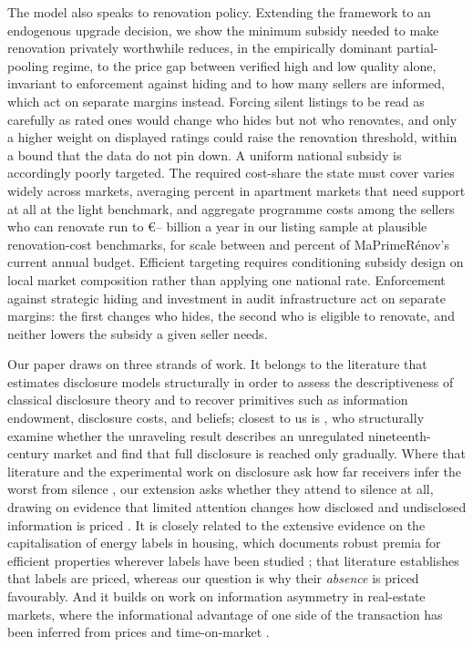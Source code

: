 The model also speaks to renovation policy. Extending the framework to an endogenous upgrade
decision, we show the minimum subsidy needed to make renovation privately worthwhile reduces, in
the empirically dominant partial-pooling regime, to the price gap between verified high and low
quality alone, invariant to enforcement against hiding and to how many sellers are informed,
which act on separate margins instead. Forcing silent listings to be read as carefully as rated ones would change who hides but not who renovates, and only a higher weight on displayed ratings could raise the renovation threshold, within a bound that the data do not pin down. %
A uniform national subsidy is accordingly poorly targeted. The
required cost-share the state must cover varies widely across
markets, averaging \attBaseCostShareTwoFiftyApt{} percent in apartment markets that need support at all at the light benchmark, and aggregate programme costs among the sellers who can renovate run to
\euro{}\attScCostBaseTotTwoFifty{}--\attScCostBaseTotFiveHundred{} billion a year in our listing sample at plausible renovation-cost benchmarks, for scale between \attScCostBaseTotTwoFiftyLo{} and
\attScCostBaseTotFiveHundredHi{} percent of MaPrimeR\'enov's current annual budget. Efficient targeting requires conditioning subsidy design
on local market composition rather than applying one national rate. Enforcement against strategic hiding and investment in audit
infrastructure act on separate margins: the first changes who hides, the second who is eligible to renovate, and neither lowers the subsidy a given seller needs.

Our paper draws on three strands of work. It belongs to the literature that estimates
disclosure models structurally in order to assess the descriptiveness of classical disclosure
theory and to recover primitives such as information endowment, disclosure costs, and beliefs;
closest to us is \citet{bourveau_learning_2025}, who structurally examine whether the unraveling
result describes an unregulated nineteenth-century market and find that full disclosure is
reached only gradually. Where that literature and the experimental work on disclosure ask how far
receivers infer the worst from silence \citep{jin_is_2021, hagenbach_motivated_2025}, our extension
asks whether they attend to silence at all, drawing on evidence that limited attention changes how
disclosed and undisclosed information is priced \citep{hirshleifer_limited_2003, dellavigna_investor_2009}.
It is closely related to the extensive evidence on the capitalisation of energy labels in
housing, which documents robust premia for efficient properties wherever labels have been
studied \citep{brounen_kok_2011, hyland_lyons_2013, fuerst_energy_2016, frondel_power_2018,
myers_mandatory_2022}; that literature establishes that labels are priced, whereas our question
is why their \emph{absence} is priced favourably. And it builds on work on information
asymmetry in real-estate markets, where the informational advantage of one side of the
transaction has been inferred from prices and time-on-market \citep{levitt_syverson_2008,
lizzeri_1999}.

